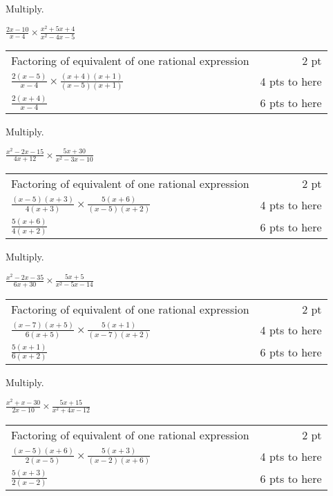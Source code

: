 {
	Multiply.\par
	$\displaystyle\frac{2x-10}{x-4} \times \frac{x^2+5x+4}{x^2-4x-5}$
}
{
	\begin{tabular}{l r}
	Factoring of equivalent of one rational expression & 2 pt \\
	$\frac{2(x-5)}{x-4}\times \frac{(x+4)(x+1)}{(x-5)(x+1)}$ & 4 pts to here\\
	$\frac{2(x+4)}{x-4}$ & 6 pts to here
	\end{tabular}
}

{
	Multiply.\par
	$\displaystyle\frac{x^2-2x-15}{4x+12} \times \frac{5x+30}{x^2-3x-10}$
}
{
	\begin{tabular}{l r}
	Factoring of equivalent of one rational expression & 2 pt \\
	$\frac{(x-5)(x+3)}{4(x+3)}\times \frac{5(x+6)}{(x-5)(x+2)}$ & 4 pts to here\\
	$\frac{5(x+6)}{4(x+2)}$ & 6 pts to here
	\end{tabular}
}

{
	Multiply.\par
	$\displaystyle\frac{x^2-2x-35}{6x+30} \times \frac{5x+5}{x^2-5x-14}$
}
{
	\begin{tabular}{l r}
	Factoring of equivalent of one rational expression & 2 pt \\
	$\frac{(x-7)(x+5)}{6(x+5)}\times \frac{5(x+1)}{(x-7)(x+2)}$ & 4 pts to here\\
	$\frac{5(x+1)}{6(x+2)}$ & 6 pts to here
	\end{tabular}
}

{
	Multiply.\par
	$\displaystyle\frac{x^2+x-30}{2x-10} \times \frac{5x+15}{x^2+4x-12}$
}
{
	\begin{tabular}{l r}
	Factoring of equivalent of one rational expression & 2 pt \\
	$\frac{(x-5)(x+6)}{2(x-5)}\times \frac{5(x+3)}{(x-2)(x+6)}$ & 4 pts to here\\
	$\frac{5(x+3)}{2(x-2)}$ & 6 pts to here
	\end{tabular}
}
